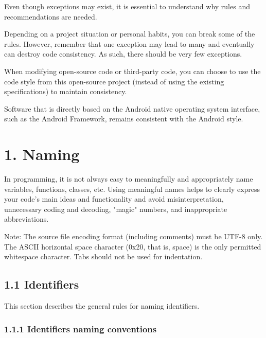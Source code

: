 \label{sec:}



Even though exceptions may exist, it is essential to understand why rules and recommendations are needed.

Depending on a project situation or personal habits, you can break some of the rules. However, remember that one exception may lead to many and eventually can destroy code consistency. As such, there should be very few exceptions.

When modifying open-source code or third-party code, you can choose to use the code style from this open-source project (instead of using the existing specifications) to maintain consistency.

Software that is directly based on the Android native operating system interface, such as the Android Framework, remains consistent with the Android style.

\section*{\textbf{1. Naming}}

\label{sec:1.}

In programming, it is not always easy to meaningfully and appropriately name variables, functions, classes, etc. Using meaningful names helps to clearly express your code's main ideas and functionality and avoid misinterpretation, unnecessary coding and decoding, "magic" numbers, and inappropriate abbreviations.



Note: The source file encoding format (including comments) must be UTF-8 only. The ASCII horizontal space character (0x20, that is, space) is the only permitted whitespace character. Tabs should not be used for indentation.



\subsection*{\textbf{1.1 Identifiers}}

\label{sec:1.1}

This section describes the general rules for naming identifiers.

\subsubsection*{\textbf{1.1.1 Identifiers naming conventions}}
\leavevmode\newline

